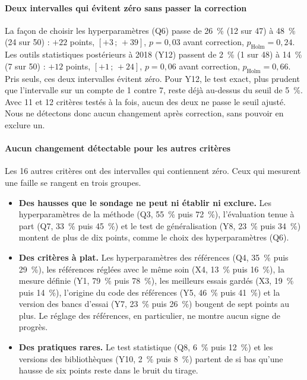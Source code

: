 \paragraph{Deux intervalles qui évitent zéro sans passer la correction}
La façon de choisir les hyperparamètres (Q6) passe de 26~\% (12 sur 47) à 48~\% (24 sur 50) : $+22$
points, $[+3\,;\,+39]$, $p = 0{,}03$ avant correction, $p_{\text{Holm}} = 0{,}24$. Les outils
statistiques postérieurs à 2018 (Y12) passent de 2~\% (1 sur 48) à 14~\% (7 sur 50) : $+12$ points,
$[+1\,;\,+24]$, $p = 0{,}06$ avant correction, $p_{\text{Holm}} = 0{,}66$. Pris seuls, ces deux
intervalles évitent zéro. Pour Y12, le test exact, plus prudent que l'intervalle sur un compte de 1
contre 7, reste déjà au-dessus du seuil de 5~\%. Avec 11 et 12 critères testés à la fois, aucun des
deux ne passe le seuil ajusté. Nous ne détectons donc aucun
changement après correction, sans pouvoir en exclure un.

\paragraph{Aucun changement détectable pour les autres critères}
Les 16 autres critères ont des intervalles qui contiennent zéro. Ceux qui mesurent une faille se rangent
en trois groupes.
\begin{itemize}
  \item \textbf{Des hausses que le sondage ne peut ni établir ni exclure.} Les hyperparamètres de la méthode
  (Q3, 55~\% puis 72~\%), l'évaluation tenue à part (Q7, 33~\% puis 45~\%) et le test de généralisation (Y8,
  23~\% puis 34~\%) montent de plus de dix points, comme le choix des hyperparamètres (Q6).
  \item \textbf{Des critères à plat.} Les hyperparamètres des références (Q4, 35~\% puis 29~\%), les
  références réglées avec le même soin (X4, 13~\% puis 16~\%), la mesure définie (Y1, 79~\% puis 78~\%), les
  meilleurs essais gardés (X3, 19~\% puis 14~\%), l'origine du code des références (Y5, 46~\% puis 41~\%) et
  la version des bancs d'essai (Y7, 23~\% puis 26~\%) bougent de sept points au plus. Le réglage des
  références, en particulier, ne montre aucun signe de progrès.
  \item \textbf{Des pratiques rares.} Le test statistique (Q8, 6~\% puis 12~\%) et les versions des
  bibliothèques (Y10, 2~\% puis 8~\%) partent de si bas qu'une hausse de six points reste dans le bruit du
  tirage.
\end{itemize}


